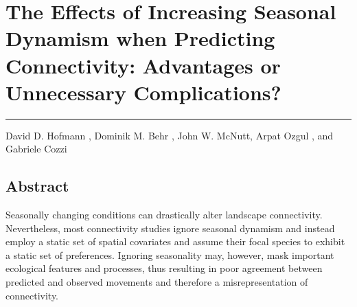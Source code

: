 \documentclass[../FinalThesis.tex]{subfiles}
\begin{document}
\chapter{The Effects of Increasing Seasonal Dynamism when Predicting
Connectivity: Advantages or Unnecessary Complications?}
\label{ChapterSeasonality}
\thispagestyle{empty}
\vspace{-1cm}
\noindent\hfil\rule{0.75\textwidth}{.4pt}\hfil

\begin{center}
David D. Hofmann ,
Dominik M. Behr ,
John W. McNutt,
Arpat Ozgul , and
Gabriele Cozzi 


\vfill

%
%
%
%

\end{center}


%
%


\newpage
\section*{Abstract}

Seasonally changing conditions can drastically alter landscape connectivity.
Nevertheless, most connectivity studies ignore seasonal dynamism and instead
employ a static set of spatial covariates and assume their focal species to
exhibit a static set of preferences. Ignoring seasonality may, however, mask
important ecological features and processes, thus resulting in poor agreement
between predicted and observed movements and therefore a misrepresentation of
connectivity.
\end{document}
